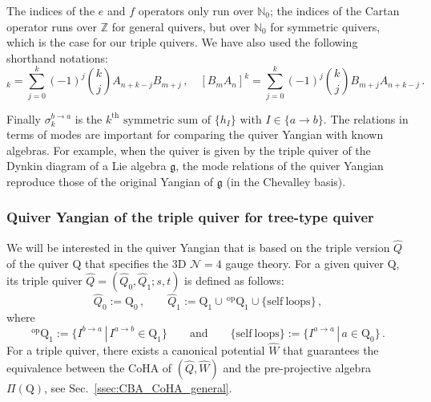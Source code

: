 \documentclass[12pt,a4paper]{article}
\renewcommand{\(}{\left(}
\renewcommand{\)}{\right)}
\renewcommand{\(}{\left(}
\renewcommand{\)}{\right)}
\begin{document}
\noindent The indices of the $e$ and $f$ operators only run over $\mathbb{N}_0$; the indices of the Cartan operator runs over $\mathbb{Z}$ for general quivers, but over $\mathbb{N}_0$ for symmetric quivers, which is the case for our triple quivers.
We have also used the following shorthand notations:
{\small
	\begin{equation}
		[A_n B_m]_k=\sum_{j=0}^k(-1)^{j}\binom{k}{j}A_{n+k-j}B_{m+j}\,,\quad
		[B_m A_n]^k=\sum_{j=0}^k(-1)^{j}\binom{k}{j}B_{m+j}A_{n+k-j}\,.
\end{equation}}

\noindent Finally $\sigma^{b\to a}_{k}$ is the $\text{$k^{\textrm{th}}$ symmetric sum of $\{h_I\}$ with }I\in \{a\to b\}$.
The relations in terms of modes are important for comparing the quiver Yangian with known algebras. 
For example, when the quiver is given by the triple quiver of the Dynkin diagram of a Lie algebra $\mathfrak{g}$, the mode relations of the quiver Yangian reproduce those of the original Yangian of $\mathfrak{g}$ (in the Chevalley basis).




 
	
\subsubsection{Quiver Yangian of the triple quiver for tree-type quiver}\label{ssec:QY_triple}

We will be interested in the quiver Yangian that is based on the triple version $\widehat{Q}$ of the quiver $\mathrm{Q}$ that specifies the 3D $\mathcal{N}=4$ gauge theory.
For a given quiver $\mathrm{Q}$, its triple quiver $\widehat{Q}=(\widehat{Q}_0,\widehat{Q}_1; s,t)$ is defined as follows:
\begin{equation}\label{eq:tripleQdef}
	\widehat{Q}_0:=\mathrm{Q}_0\,, \qquad \widehat{Q}_1:=\mathrm{Q}_1\cup \,  {}^{\textrm{op}}\mathrm{Q}_1\cup
	\{\mathrm{self\ loops}\}\,,
\end{equation}
where
\begin{equation}\label{eq:tripleQdef2}
	{}^{\textrm{op}}\mathrm{Q}_1:=\{I^{b\rightarrow a}\, |\, I^{a\rightarrow b} \in \mathrm{Q}_1\}
	\qquad\textrm{and} \qquad
	\{\mathrm{self\ loops}\}:=\{I^{a\rightarrow a}\,|\, a\in \mathrm{Q}_0\}\,.
\end{equation}
For a triple quiver, there exists a canonical potential $\widehat{W}$ that guarantees the equivalence between the CoHA of $(\widehat{Q},\widehat{W})$ and the pre-projective algebra $\Pi(\mathrm{Q})$, see Sec.~\ref{ssec:CBA_CoHA_general}.
\end{document}
